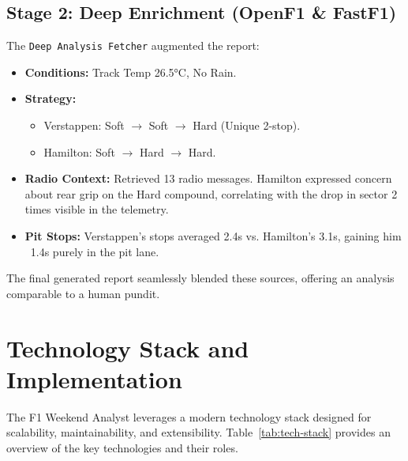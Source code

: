 \documentclass[11pt]{article}
\begin{document}
\subsection{Stage 2: Deep Enrichment (OpenF1 \& FastF1)}
The \texttt{Deep Analysis Fetcher} augmented the report:
\begin{itemize}
    \item \textbf{Conditions:} Track Temp 26.5°C, No Rain.
    \item \textbf{Strategy:}
    \begin{itemize} 
        \item Verstappen: Soft $\to$ Soft $\to$ Hard (Unique 2-stop).
        \item Hamilton: Soft $\to$ Hard $\to$ Hard.
    \end{itemize}
    \item \textbf{Radio Context:} Retrieved 13 radio messages. Hamilton expressed concern about rear grip on the Hard compound, correlating with the drop in sector 2 times visible in the telemetry.
    \item \textbf{Pit Stops:} Verstappen's stops averaged 2.4s vs. Hamilton's 3.1s, gaining him ~1.4s purely in the pit lane.
\end{itemize}

The final generated report seamlessly blended these sources, offering an analysis comparable to a human pundit.

\section{Technology Stack and Implementation}

The F1 Weekend Analyst leverages a modern technology stack designed for scalability, maintainability, and extensibility. Table~\ref{tab:tech-stack} provides an overview of the key technologies and their roles.
\end{document}

